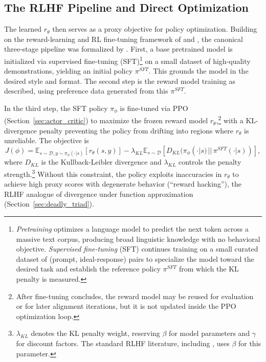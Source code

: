 \subsection{The RLHF Pipeline and Direct Optimization}

The learned $r_\theta$ then serves as a proxy objective for policy optimization. Building on the reward-learning and RL fine-tuning framework of \citet{ziegler2019fine} and \citet{stiennon2020learning}, the canonical three-stage pipeline was formalized by \citet{ouyang2022training}. First, a base pretrained model is initialized via supervised fine-tuning (SFT)\footnote{\emph{Pretraining} optimizes a language model to predict the next token across a massive text corpus, producing broad linguistic knowledge with no behavioral objective. \emph{Supervised fine-tuning} (SFT) continues training on a small curated dataset of (prompt, ideal-response) pairs to specialize the model toward the desired task and establish the reference policy $\pi^{SFT}$ from which the KL penalty is measured.} on a small dataset of high-quality demonstrations, yielding an initial policy $\pi^{SFT}$. This grounds the model in the desired style and format. The second step is the reward model training as described, using preference data generated from this $\pi^{SFT}$.

In the third step, the SFT policy $\pi_\phi$ is fine-tuned via PPO (Section~\ref{sec:actor_critic}) to maximize the frozen reward model $r_\theta$,\footnote{After fine-tuning concludes, the reward model may be reused for evaluation or for later alignment iterations, but it is not updated inside the PPO optimization loop.} with a KL-divergence penalty preventing the policy from drifting into regions where $r_\theta$ is unreliable. The objective is
\begin{equation}
    J(\phi) = \mathbb{E}_{s \sim \mathcal{D}, y \sim \pi_\phi(\cdot|s)} [r_\theta(s, y)] - \lambda_{KL} \mathbb{E}_{s \sim \mathcal{D}} [D_{KL}(\pi_\phi(\cdot|s) \,||\, \pi^{SFT}(\cdot|s))],
\label{eq:rlhf_objective}
\end{equation}
where $D_{KL}$ is the Kullback-Leibler divergence and $\lambda_{KL}$ controls the penalty strength.\footnote{$\lambda_{KL}$ denotes the KL penalty weight, reserving $\beta$ for model parameters and $\gamma$ for discount factors. The standard RLHF literature, including \citet{rafailov2023direct}, uses $\beta$ for this parameter.} Without this constraint, the policy exploits inaccuracies in $r_\theta$ to achieve high proxy scores with degenerate behavior (``reward hacking''), the RLHF analogue of divergence under function approximation (Section~\ref{sec:deadly_triad}).

